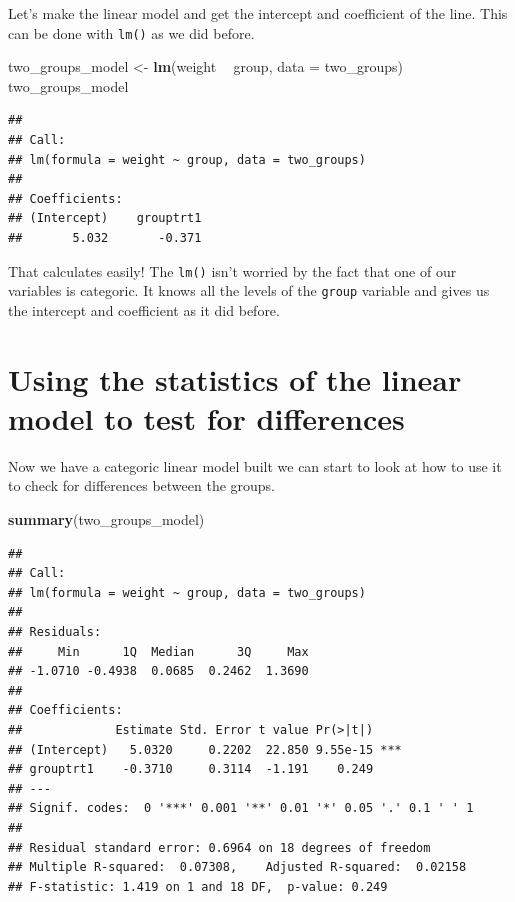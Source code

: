 \documentclass[
]{book}
\newenvironment{Shaded}{\begin{snugshade}}{\end{snugshade}}
\newcommand{\DataTypeTok}[1]{\textcolor[rgb]{0.13,0.29,0.53}{#1}}
\newcommand{\KeywordTok}[1]{\textcolor[rgb]{0.13,0.29,0.53}{\textbf{#1}}}
\newcommand{\NormalTok}[1]{#1}
\newcommand{\OperatorTok}[1]{\textcolor[rgb]{0.81,0.36,0.00}{\textbf{#1}}}
\newcommand{\StringTok}[1]{\textcolor[rgb]{0.31,0.60,0.02}{#1}}
\begin{document}
Let's make the linear model and get the intercept and coefficient of the line. This can be done with \texttt{lm()} as we did before.

\begin{Shaded}
\begin{Highlighting}[]
\NormalTok{two_groups_model <-}\StringTok{ }\KeywordTok{lm}\NormalTok{(weight }\OperatorTok{~}\StringTok{ }\NormalTok{group, }\DataTypeTok{data =}\NormalTok{ two_groups)}
\NormalTok{two_groups_model}
\end{Highlighting}
\end{Shaded}

\begin{verbatim}
## 
## Call:
## lm(formula = weight ~ group, data = two_groups)
## 
## Coefficients:
## (Intercept)    grouptrt1  
##       5.032       -0.371
\end{verbatim}

That calculates easily! The \texttt{lm()} isn't worried by the fact that one of our variables is categoric. It knows all the levels of the \texttt{group} variable and gives us the intercept and coefficient as it did before.

\hypertarget{using-the-statistics-of-the-linear-model-to-test-for-differences}{%
\section{Using the statistics of the linear model to test for differences}\label{using-the-statistics-of-the-linear-model-to-test-for-differences}}

Now we have a categoric linear model built we can start to look at how to use it to check for differences between the groups.

\begin{Shaded}
\begin{Highlighting}[]
\KeywordTok{summary}\NormalTok{(two_groups_model)}
\end{Highlighting}
\end{Shaded}

\begin{verbatim}
## 
## Call:
## lm(formula = weight ~ group, data = two_groups)
## 
## Residuals:
##     Min      1Q  Median      3Q     Max 
## -1.0710 -0.4938  0.0685  0.2462  1.3690 
## 
## Coefficients:
##             Estimate Std. Error t value Pr(>|t|)    
## (Intercept)   5.0320     0.2202  22.850 9.55e-15 ***
## grouptrt1    -0.3710     0.3114  -1.191    0.249    
## ---
## Signif. codes:  0 '***' 0.001 '**' 0.01 '*' 0.05 '.' 0.1 ' ' 1
## 
## Residual standard error: 0.6964 on 18 degrees of freedom
## Multiple R-squared:  0.07308,	Adjusted R-squared:  0.02158 
## F-statistic: 1.419 on 1 and 18 DF,  p-value: 0.249
\end{verbatim}
\end{document}

